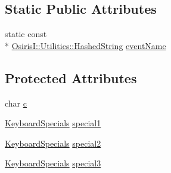\subsection*{Static Public Attributes}
\begin{DoxyCompactItemize}
\item 
static const \\*
\hyperlink{class_osiris_i_1_1_utilities_1_1_hashed_string}{Osiris\-I\-::\-Utilities\-::\-Hashed\-String} \hyperlink{struct_osiris_i_1_1_events_1_1_osiris_i___keyboard_input_event_a54a6dd89225c34a645ad57eb9447f330}{event\-Name}
\end{DoxyCompactItemize}
\subsection*{Protected Attributes}
\begin{DoxyCompactItemize}
\item 
char \hyperlink{struct_osiris_i_1_1_events_1_1_osiris_i___keyboard_input_event_aa717e3c573cf4eba259407540a74cd7e}{c}
\item 
\hyperlink{namespace_osiris_i_1_1_events_a9e0e697b7b35b97c94c7b6d758a117be}{Keyboard\-Specials} \hyperlink{struct_osiris_i_1_1_events_1_1_osiris_i___keyboard_input_event_aad65b77927292b961d4054e8aae8096a}{special1}
\item 
\hyperlink{namespace_osiris_i_1_1_events_a9e0e697b7b35b97c94c7b6d758a117be}{Keyboard\-Specials} \hyperlink{struct_osiris_i_1_1_events_1_1_osiris_i___keyboard_input_event_a7127dfdb264bf84beeda9309b17de587}{special2}
\item 
\hyperlink{namespace_osiris_i_1_1_events_a9e0e697b7b35b97c94c7b6d758a117be}{Keyboard\-Specials} \hyperlink{struct_osiris_i_1_1_events_1_1_osiris_i___keyboard_input_event_ad9943b19700d470d1c8d06a38fbc5de0}{special3}
\end{DoxyCompactItemize}



